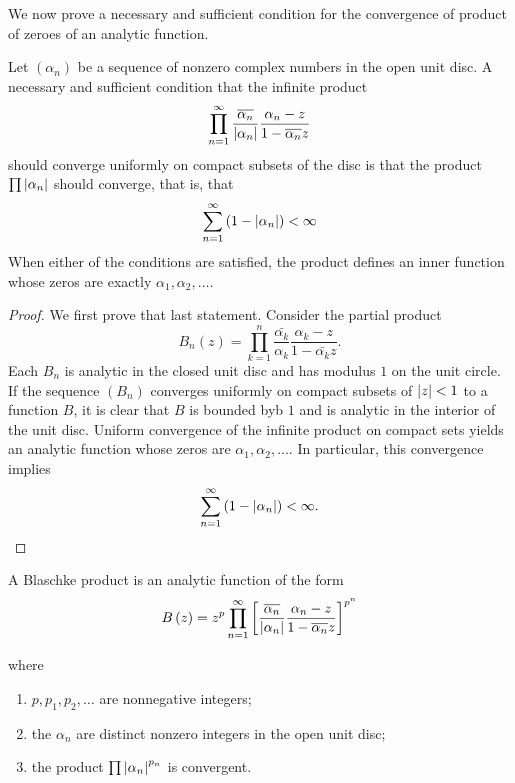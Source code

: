 We now prove a necessary and sufficient condition for the convergence of product of zeroes of an analytic function.

\begin{theorem}
    Let $\left( \alpha_{n} \right)$ be a sequence of nonzero complex numbers in the open unit disc. A necessary and sufficient condition that the infinite product 
    \begin{equation*}
	\prod_{n=1}^{\infty} \frac{\overline{\alpha_{n}}}{\left\lvert \alpha_{n} \right\rvert} \frac{\alpha_{n} - z}{ 1- \overline{\alpha_{n}}z}
    \end{equation*}
    should converge uniformly on compact subsets of the disc is that the product $\prod \left\lvert \alpha_{n} \right\rvert$ should converge, that is, that 
    \begin{equation*}
	\sum_{n=1}^{\infty} \left( 1-\left\lvert \alpha_{n} \right\rvert \right) < \infty
    \end{equation*}
    When either of the conditions are satisfied, the product defines an inner function whose zeros are exactly $\alpha_{1}, \alpha_{2}, \ldots$.
\end{theorem}
\begin{proof}
    We first prove that last statement. Consider the partial product
    \begin{equation*}
	B_{n} \left( z \right) = \prod_{k=1}^{n} \frac{\bar{\alpha_{k}}}{\alpha_{k}} \frac{\alpha_{k}-z}{1-\bar{\alpha_{k}}z}.
    \end{equation*}
    Each $B_{n}$ is analytic in the closed unit disc and has modulus $1$ on the unit circle. If the sequence $\left( B_{n} \right)$ converges uniformly on compact subsets of $\left\lvert z \right\rvert < 1$ to a function $B$, it is clear that $B$ is bounded byb $1$ and is analytic in the interior of the unit disc. Uniform convergence of the infinite product on compact sets yields an analytic function whose zeros are $\alpha_{1}, \alpha_{2}, \ldots$. In particular, this convergence implies
    \begin{equation*}
	\sum_{n=1}^{\infty} \left( 1-\left\lvert \alpha_{n} \right\rvert \right) < \infty.
    \end{equation*}
\end{proof}

\begin{definition}
    A Blaschke product is an analytic function of the form
    \begin{equation*}
	B\left( z \right) = z^{p} \prod_{n=1}^{\infty} \left[ \frac{\overline{\alpha_{n}}}{\left\lvert \alpha_{n} \right\rvert} \frac{\alpha_{n}-z}{1-\overline{\alpha_{n}}z} \right]^{p^{n}}
    \end{equation*}

    where
    \begin{enumerate}[label=(\roman*)]
	\item $p, p_{1}, p_{2}, \ldots$ are nonnegative integers;
	\item the $\alpha_{n}$ are distinct nonzero integers in the open unit disc;
	\item the product $\prod \left\lvert \alpha_{n} \right\rvert^{p_{n}}$ is convergent.
    \end{enumerate}
    \label{def:blaschke-product}
\end{definition}

